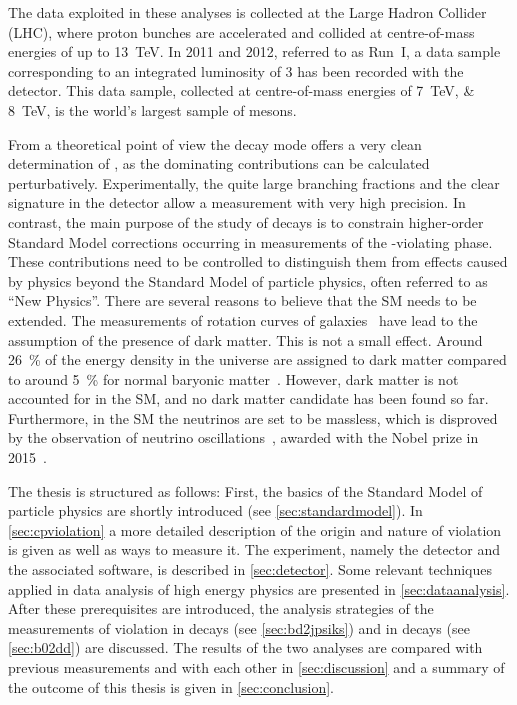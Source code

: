 The data exploited in these analyses is collected at the Large Hadron Collider
(LHC), where proton bunches are accelerated and collided at centre-of-mass
energies of up to \SI{13}{\TeV}. In 2011 and 2012, referred to as Run~I, a
data sample corresponding to an integrated luminosity of \SI{3}{\invfb} has
been recorded with the \lhcb detector. This data sample, collected at
centre-of-mass energies of \SIlist{7;8}{\TeV}, is the world's largest sample
of \Bz mesons.

From a theoretical point of view the decay mode \BdToJPsiKS offers a very
clean determination of \sintwobeta, as the dominating contributions can be
calculated perturbatively. Experimentally, the quite large branching fractions
and the clear signature in the detector allow a measurement with very high
precision. In contrast, the main purpose of the study of \BdToDD decays is to
constrain higher-order Standard Model corrections occurring in measurements of
the \CP-violating phase. These contributions need to be controlled to
distinguish them from effects caused by physics beyond the Standard Model of
particle physics, often referred to as \enquote{New Physics}. There are
several reasons to believe that the SM needs to be extended. The measurements
of rotation curves of galaxies~\cite{AndromedaNebula} have lead to the
assumption of the presence of dark matter. This is not a small effect. Around
\SI{26}{\percent} of the energy density in the universe are assigned to dark
matter compared to around \SI{5}{\percent} for normal baryonic
matter~\cite{Ade:2015xua}. However, dark matter is not accounted for in the
SM, and no dark matter candidate has been found so far. Furthermore, in the SM
the neutrinos are set to be massless, which is disproved by the observation of
neutrino oscillations~\cite{Fukuda:1998mi,Ahmad:2001an,*Ahmad:2002jz}, awarded
with the Nobel prize in 2015~\cite{NobelPrize2015}.

The thesis is structured as follows: First, the basics of the
Standard Model of particle physics are shortly introduced (see
\cref{sec:standardmodel}). In \cref{sec:cpviolation} a more detailed
description of the origin and nature of \CP violation is given as well as ways
to measure it. The \lhcb experiment, namely the detector and the associated
software, is described in \cref{sec:detector}. Some relevant techniques
applied in data analysis of high energy physics are presented in
\cref{sec:dataanalysis}. After these prerequisites are introduced, the analysis
strategies of the measurements of \CP violation in \BdToJPsiKS decays (see
\cref{sec:bd2jpsiks}) and in \BdToDD decays (see \cref{sec:b02dd}) are
discussed. The results of the two analyses are compared with previous
measurements and with each other in \cref{sec:discussion} and a summary of the
outcome of this thesis is given in \cref{sec:conclusion}.
